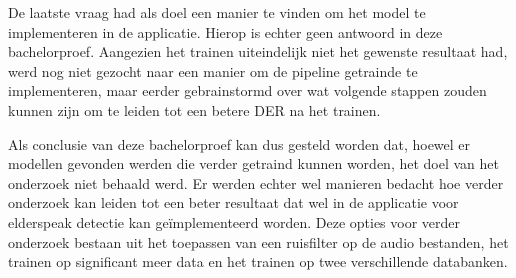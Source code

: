 De laatste vraag had als doel een manier te vinden om het model te implementeren in de applicatie. Hierop is echter geen antwoord in deze bachelorproef. Aangezien het trainen uiteindelijk niet het gewenste resultaat had, werd nog niet gezocht naar een manier om de pipeline getrainde te implementeren, maar eerder gebrainstormd over wat volgende stappen zouden kunnen zijn om te leiden tot een betere DER na het trainen.

Als conclusie van deze bachelorproef kan dus gesteld worden dat, hoewel er modellen gevonden werden die verder getraind kunnen worden, het doel van het onderzoek niet behaald werd. Er werden echter wel manieren bedacht hoe verder onderzoek kan leiden tot een beter resultaat dat wel in de applicatie voor elderspeak detectie kan geïmplementeerd worden. Deze opties voor verder onderzoek bestaan uit het toepassen van een ruisfilter op de audio bestanden, het trainen op significant meer data en het trainen op twee verschillende databanken.